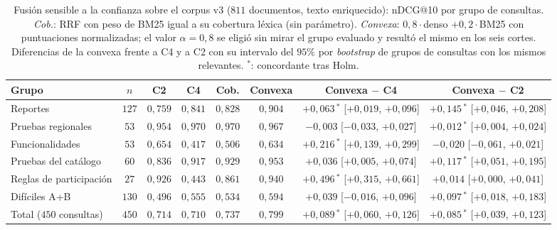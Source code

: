 \documentclass[11pt,letterpaper]{article}
\numberwithin{equation}{section}
\begin{document}
\begin{table}[htbp]
\centering
\footnotesize
\setlength{\tabcolsep}{1.5pt}
\renewcommand{\arraystretch}{1.2}
\caption{Fusión sensible a la confianza sobre el corpus v3 ($811$ documentos, texto enriquecido): nDCG@10 por grupo de consultas. \emph{Cob.}: RRF con peso de BM25 igual a su cobertura léxica (sin parámetro). \emph{Convexa}: $0{,}8\cdot$denso $+ 0{,}2\cdot$BM25 con puntuaciones normalizadas; el valor $\alpha=0{,}8$ se eligió sin mirar el grupo evaluado y resultó el mismo en los seis cortes. Diferencias de la convexa frente a C4 y a C2 con su intervalo del $95\%$ por \textit{bootstrap} de grupos de consultas con los mismos relevantes. $^{*}$: concordante tras Holm.}
\label{tab:v3-fusion}
\begin{tabularx}{\textwidth}{@{}l c C C C C c c@{}}
\toprule
\textbf{Grupo} & $n$ & \textbf{C2} & \textbf{C4} & \textbf{Cob.} & \textbf{Convexa} & \textbf{Convexa $-$ C4} & \textbf{Convexa $-$ C2} \\
\midrule
Reportes & $127$ & $0{,}759$ & $0{,}841$ & $0{,}828$ & $0{,}904$ & $+0{,}063$\,$^{*}$ [$+0{,}019$, $+0{,}096$] & $+0{,}145$\,$^{*}$ [$+0{,}046$, $+0{,}208$] \\
Pruebas regionales & $53$ & $0{,}954$ & $0{,}970$ & $0{,}970$ & $0{,}967$ & $-0{,}003$ [$-0{,}033$, $+0{,}027$] & $+0{,}012$\,$^{*}$ [$+0{,}004$, $+0{,}024$] \\
Funcionalidades & $53$ & $0{,}654$ & $0{,}417$ & $0{,}506$ & $0{,}634$ & $+0{,}216$\,$^{*}$ [$+0{,}139$, $+0{,}299$] & $-0{,}020$ [$-0{,}061$, $+0{,}021$] \\
Pruebas del catálogo & $60$ & $0{,}836$ & $0{,}917$ & $0{,}929$ & $0{,}953$ & $+0{,}036$ [$+0{,}005$, $+0{,}074$] & $+0{,}117$\,$^{*}$ [$+0{,}051$, $+0{,}195$] \\
Reglas de participación & $27$ & $0{,}926$ & $0{,}443$ & $0{,}861$ & $0{,}940$ & $+0{,}496$\,$^{*}$ [$+0{,}315$, $+0{,}661$] & $+0{,}014$ [$+0{,}000$, $+0{,}041$] \\
Difíciles A+B & $130$ & $0{,}496$ & $0{,}555$ & $0{,}534$ & $0{,}594$ & $+0{,}039$ [$-0{,}016$, $+0{,}096$] & $+0{,}097$\,$^{*}$ [$+0{,}018$, $+0{,}183$] \\
\midrule
Total ($450$ consultas) & $450$ & $0{,}714$ & $0{,}710$ & $0{,}737$ & $0{,}799$ & $+0{,}089$\,$^{*}$ [$+0{,}060$, $+0{,}126$] & $+0{,}085$\,$^{*}$ [$+0{,}039$, $+0{,}123$] \\
\bottomrule
\end{tabularx}
\end{table}
\end{document}
